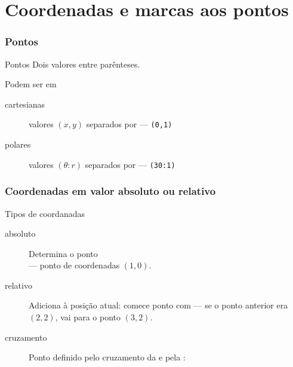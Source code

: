 \section{Coordenadas e marcas aos pontos}

\begin{frame}
  \frametitle{Pontos}

  \begin{block}{Pontos}
    Dois valores entre parênteses.
  \end{block}
\bigskip

  Podem ser em 
  \begin{description}
  \item[cartesianas] valores $(x,y)$ separados por  --- \texttt{(0,1)}
  \item[polares] valores $(\theta:r)$ separados por  --- \texttt{(30:1)}
  \end{description}
\end{frame}

\begin{frame}
  \frametitle{Coordenadas em valor absoluto ou relativo}

  \begin{block}{Tipos de coordanadas}
    \begin{description}
    \item[absoluto] Determina o ponto\\
       --- ponto de coordenadas $(1,0)$.
    \item[relativo] Adiciona à posição atual: comece ponto com
      \green{\texttt{++}}
       --- se o ponto anterior era $(2,2)$, vai
      para o ponto $(3,2)$.
    
    \item[cruzamento] Ponto definido pelo cruzamento da  e pela :\\
      \texttt{}

    \end{description}
  \end{block}

\end{frame}


